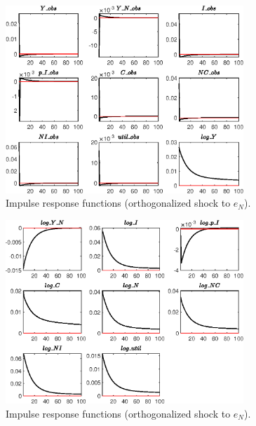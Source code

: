 \begin{figure}[H]
\centering 
\includegraphics[width=0.80\textwidth]{BRS_imp_mobility_alt/graphs/BRS_imp_mobility_alt_IRF_e_N1}
\caption{Impulse response functions (orthogonalized shock to ${e_N}$).}\label{Fig:IRF:e_N:1}
\end{figure}
 
\begin{figure}[H]
\centering 
\includegraphics[width=0.80\textwidth]{BRS_imp_mobility_alt/graphs/BRS_imp_mobility_alt_IRF_e_N2}
\caption{Impulse response functions (orthogonalized shock to ${e_N}$).}\label{Fig:IRF:e_N:2}
\end{figure}
 
